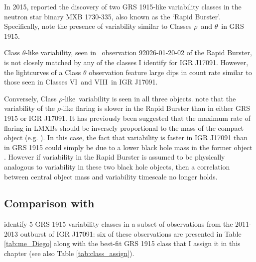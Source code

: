 \par In 2015, \citet{Bagnoli_RB} reported the discovery of two GRS 1915-like variability classes in the neutron star binary MXB 1730-335, also known as the `Rapid Burster'.  Specifically, \citet{Bagnoli_RB} note the presence of variability similar to Classes $\rho$\indexrho\ and $\theta$\indextheta\ in GRS 1915.
\par Class $\theta$\indextheta-like variability, seen in \indexrxte\rxte\ observation 92026-01-20-02 of the Rapid Burster, is not closely matched by any of the classes I identify for IGR J17091.  However, the lightcurves of a Class $\theta$ observation feature large dips in count rate similar to those seen in Classes VI\indexvi\ and VIII\indexviii\ in IGR J17091.
\par Conversely, Class $\rho$-like\indexrho\ variability is seen in all three objects.  \citet{Bagnoli_RB} note that the variability of the $\rho$-like flaring is slower in the Rapid Burster than in either GRS 1915 or IGR J17091. It has previously been suggested that the maximum rate of flaring in LMXBs should be inversely proportional to the mass of the compact object (e.g. \citealp{Belloni_Timescales,Frank_Timescales}).  In this case, the fact that variability is faster in IGR J17091 than in GRS 1915 could simply be due to a lower black hole mass in the former object \citep{Altamirano_IGR_FH}.  However if variability in the Rapid Burster is assumed to be physically analogous to variability in these two black hole objects, then a correlation between central object mass and variability timescale no longer holds.

\subsection{Comparison with \citealp{Altamirano_IGR_FH}}

\label{sec:Alta}
\par \citet{Altamirano_IGR_FH} identify 5 GRS 1915 variability classes in a subset of observations from the 2011-2013 outburst of IGR J17091: six of these observations are presented in Table \ref{tab:me_Diego} along with the best-fit GRS 1915 class that I assign it in this chapter (see also Table \ref{tab:class_assign}).

